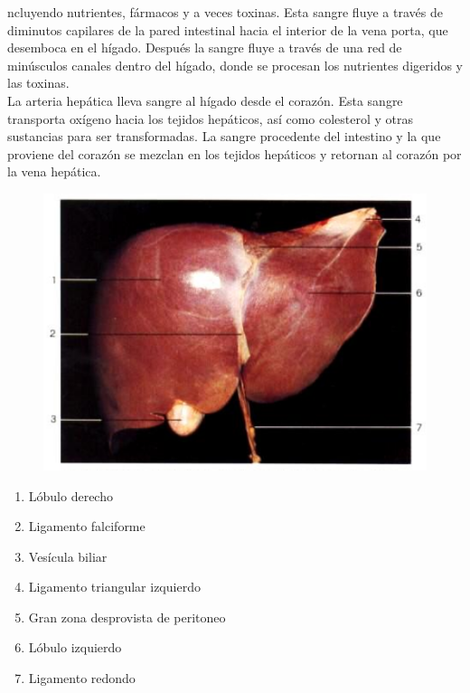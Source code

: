 ncluyendo nutrientes, fármacos y a veces toxinas. Esta sangre fluye a través de diminutos capilares de la pared intestinal hacia el interior de la vena porta, que desemboca en el hígado. 
Después la sangre fluye a través de una red de minúsculos canales dentro del hígado, donde se procesan los nutrientes digeridos y las toxinas.\\
La arteria hepática lleva sangre al hígado desde el corazón. Esta sangre transporta oxígeno hacia los tejidos hepáticos, así como colesterol y otras sustancias para ser transformadas. 
La sangre procedente del intestino y la que proviene del corazón se mezclan en los tejidos hepáticos y retornan al corazón por la vena hepática.\\
\begin{figure}[H]
	\begin{center}
 		\includegraphics[width = .7\textwidth]{v2/images/image12.png}
	\end{center} 
\end{figure}
\begin{enumerate}
    \item Lóbulo derecho
    \item Ligamento falciforme
    \item Vesícula biliar
    \item Ligamento triangular izquierdo
    \item Gran zona desprovista de peritoneo
    \item Lóbulo izquierdo
    \item Ligamento redondo    
\end{enumerate}


